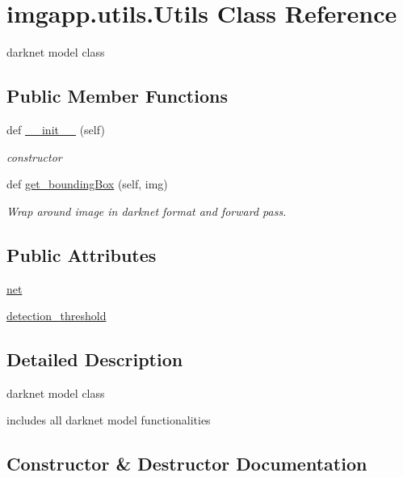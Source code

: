 \hypertarget{classimgapp_1_1utils_1_1Utils}{}\section{imgapp.\+utils.\+Utils Class Reference}
\label{classimgapp_1_1utils_1_1Utils}


darknet model class  


\subsection*{Public Member Functions}
\begin{DoxyCompactItemize}
\item 
def \hyperlink{classimgapp_1_1utils_1_1Utils_aace6e93f019f79968dd5c0b14b09eb70}{\+\_\+\+\_\+init\+\_\+\+\_\+} (self)
\begin{DoxyCompactList}\small\item\em constructor \end{DoxyCompactList}\item 
def \hyperlink{classimgapp_1_1utils_1_1Utils_aceeb858cb98ce6b5f7aa1d5e2c599490}{get\+\_\+bounding\+Box} (self, img)
\begin{DoxyCompactList}\small\item\em Wrap around image in darknet format and forward pass. \end{DoxyCompactList}\end{DoxyCompactItemize}
\subsection*{Public Attributes}
\begin{DoxyCompactItemize}
\item 
\hyperlink{classimgapp_1_1utils_1_1Utils_a421da25276568d870b9f3347dfdea33e}{net}
\item 
\hyperlink{classimgapp_1_1utils_1_1Utils_adb7539784726cf1477e24ed2433e6f72}{detection\+\_\+threshold}
\end{DoxyCompactItemize}


\subsection{Detailed Description}
darknet model class 

includes all darknet model functionalities 

\subsection{Constructor \& Destructor Documentation}
\mbox{\label{classimgapp_1_1utils_1_1Utils_aace6e93f019f79968dd5c0b14b09eb70}} 
